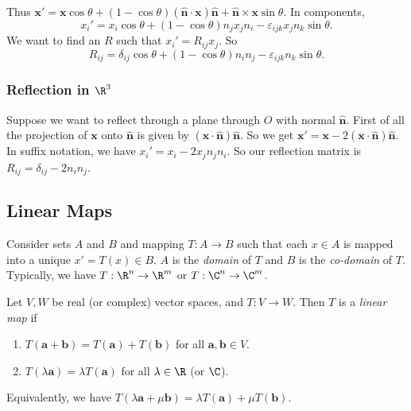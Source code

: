 \documentclass[a4paper]{article}
\begin{document}
Thus $\mathbf{x}' = \mathbf{x}\cos\theta + (1 - \cos\theta)\mathbf{(\hat{n}\cdot x)\hat{n} + \hat{n}\times x}\sin\theta$. In components,
\[
  x_i' = x_i\cos\theta + (1 - \cos\theta)n_jx_jn_i - \varepsilon_{ijk}x_jn_k\sin\theta.
\]
We want to find an $R$ such that $x_i' = R_{ij}x_j$. So
\[
  R_{ij} = \delta_{ij}\cos\theta + (1 - \cos\theta)n_in_j - \varepsilon_{ijk}n_k\sin\theta.
\]

\subsubsection{Reflection in \texorpdfstring{$\R^3$}{R3}}
Suppose we want to reflect through a plane through $O$ with normal $\hat{\mathbf{n}}$. First of all the projection of $\mathbf{x}$ onto $\hat{\mathbf{n}}$ is given by $(\mathbf{x}\cdot \hat{\mathbf{n}})\hat{\mathbf{n}}$. So we get $\mathbf{x}' = \mathbf{x} - 2\mathbf{(x\cdot \hat{n})\hat{n}}$. In suffix notation, we have $x_i' = x_i - 2x_jn_jn_i$. So our reflection matrix is $R_{ij} = \delta_{ij} - 2n_in_j$.
\begin{center}
\end{center}

\subsection{Linear Maps}
\begin{defi}
  Consider sets $A$ and $B$ and mapping $T:A\to B$ such that each $x\in A$ is mapped into a unique $x' = T(x)\in B$. $A$ is the \emph{domain} of $T$ and $B$ is the \emph{co-domain} of $T$. Typically, we have $T:\R^n \to \R^m$ or $T:\C^n\to \C^m$.
\end{defi}

\begin{defi}
  Let $V, W$ be real (or complex) vector spaces, and $T: V\to W$. Then $T$ is a \emph{linear map} if
  \begin{enumerate}
    \item $T(\mathbf{a + b}) = T(\mathbf{a}) + T(\mathbf{b})$ for all $\mathbf{a, b}\in V$.
    \item $T(\lambda\mathbf{a}) = \lambda T(\mathbf{a})$ for all $\lambda \in \R$ (or $\C$).
  \end{enumerate}
  Equivalently, we have $T(\lambda\mathbf{a} + \mu\mathbf{b}) = \lambda T(\mathbf{a}) + \mu T(\mathbf{b})$.
\end{defi}
\end{document}
